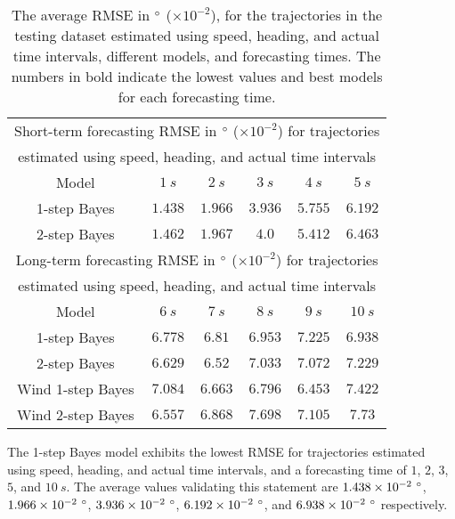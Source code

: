 \documentclass[preprint,12pt]{elsarticle}
\begin{document}
\begin{table}[!ht]
	\centering
	\begin{tabular}{|c|c|c|c|c|c|}
		\hline
		\multicolumn{6}{|c|}{Short-term forecasting RMSE in $\degree$ ($\times 10^{-2}$) for trajectories} \\ 
		\multicolumn{6}{|c|}{estimated using speed, heading, and actual time intervals} \\ \hline
		Model & $1 \ s$ & $2 \ s$ & $3 \ s$ & $4 \ s$ & $5 \ s$ \\ \hline
		1-step Bayes & $\mathbf{1.438}$ & $\mathbf{1.966}$ & $\mathbf{3.936}$ & $5.755$ & $\mathbf{6.192}$ \\ \hline
		2-step Bayes & $1.462$ & $1.967$ & $4.0$ & $\mathbf{5.412}$ & $6.463$ \\ \hline
		\multicolumn{6}{|c|}{Long-term forecasting RMSE in $\degree$ ($\times 10^{-2}$) for trajectories} \\ 
		\multicolumn{6}{|c|}{estimated using speed, heading, and actual time intervals} \\ \hline
		Model & $6 \ s$ & $7 \ s$ & $8 \ s$ & $9 \ s$ & $10 \ s$ \\ \hline
		1-step Bayes & $6.778$ & $6.81$ & $6.953$ & $7.225$ & $\mathbf{6.938}$ \\ \hline
		2-step Bayes & $6.629$ & $\mathbf{6.52}$ & $7.033$ & $7.072$ & $7.229$ \\ \hline
		Wind 1-step Bayes & $7.084$ & $6.663$ & $\mathbf{6.796}$ & $\mathbf{6.453}$ & $7.422$ \\ \hline
		Wind 2-step Bayes & $\mathbf{6.557}$ & $6.868$ & $7.698$ & $7.105$ & $7.73$ \\ \hline
	\end{tabular}
	\caption{The average RMSE in $\degree$ ($\times 10^{-2}$), for the trajectories in the testing dataset estimated using speed, heading, and actual time intervals, different models, and forecasting times. The numbers in bold indicate the lowest values and best models for each forecasting time.}
	\label{tab:best_speed_actual_dir_RMSE}
\end{table}

The 1-step Bayes model exhibits the lowest RMSE for trajectories estimated using speed, heading, and actual time intervals, and a forecasting time of $1$, $2$, $3$, $5$, and $10 \ s$. The average values validating this statement are $1.438 \times 10^{-2} \ \degree$, $1.966 \times 10^{-2} \ \degree$, $3.936 \times 10^{-2} \ \degree$, $6.192 \times 10^{-2} \ \degree$, and $6.938 \times 10^{-2} \ \degree$ respectively.
\end{document}
